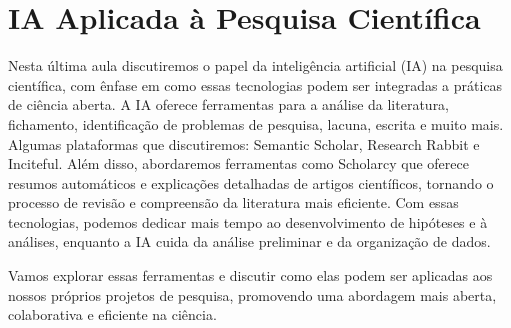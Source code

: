\documentclass[
  a4paper,
]{book}
\begin{document}

\chapter{IA Aplicada à Pesquisa Científica}\label{sec-AI}

Nesta última aula discutiremos o papel da inteligência artificial (IA)
na pesquisa científica, com ênfase em como essas tecnologias podem ser
integradas a práticas de ciência aberta. A IA oferece ferramentas para a
análise da literatura, fichamento, identificação de problemas de
pesquisa, lacuna, escrita e muito mais. Algumas plataformas que
discutiremos: Semantic Scholar, Research Rabbit e Inciteful. Além disso,
abordaremos ferramentas como Scholarcy que oferece resumos automáticos e
explicações detalhadas de artigos científicos, tornando o processo de
revisão e compreensão da literatura mais eficiente. Com essas
tecnologias, podemos dedicar mais tempo ao desenvolvimento de hipóteses
e à análises, enquanto a IA cuida da análise preliminar e da organização
de dados.

Vamos explorar essas ferramentas e discutir como elas podem ser
aplicadas aos nossos próprios projetos de pesquisa, promovendo uma
abordagem mais aberta, colaborativa e eficiente na ciência.
\end{document}
